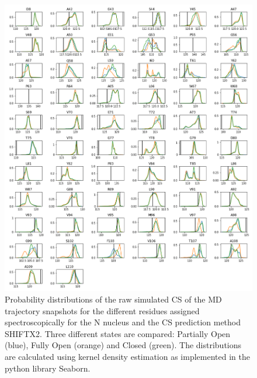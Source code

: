 \documentclass[%
 aip,
 amsmath,amssymb,
 preprint,%
]{revtex4-1}
\begin{document}
\begin{figure}[tbp]
	\includegraphics[width=\textwidth]{figures_SI/hist_shiftx2_N.png}
	 \caption{\scriptsize
 Probability distributions of the raw simulated CS of the MD trajectory snapshots for the different residues assigned spectroscopically for the N nucleus and the CS prediction method SHIFTX2. Three different states are compared: Partially Open (blue), Fully Open (orange) and Closed (green). The distributions are calculated using kernel density estimation as implemented in the python library Seaborn. 
}
\label{SI_hist4}
\end{figure}
\end{document}
